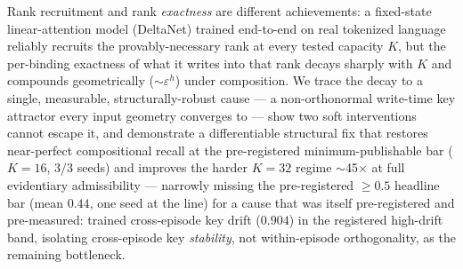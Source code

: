 Rank recruitment and rank \emph{exactness} are different achievements: a
fixed-state linear-attention model (DeltaNet) trained end-to-end on real
tokenized language reliably recruits the provably-necessary rank at every
tested capacity $K$, but the per-binding exactness of what it writes into
that rank decays sharply with $K$ and compounds geometrically ($\sim
\varepsilon^h$) under composition. We trace the decay to a single,
measurable, structurally-robust cause --- a non-orthonormal write-time key
attractor every input geometry converges to --- show two soft interventions
cannot escape it, and demonstrate a differentiable structural fix that
restores near-perfect compositional recall at the pre-registered
minimum-publishable bar ($K{=}16$, 3/3 seeds) and improves the harder
$K{=}32$ regime $\sim$45$\times$ at full evidentiary admissibility ---
narrowly missing the pre-registered $\geq 0.5$ headline bar (mean $0.44$,
one seed at the line) for a cause that was itself pre-registered and
pre-measured: trained cross-episode key drift ($0.904$) in the registered
high-drift band, isolating cross-episode key \emph{stability}, not
within-episode orthogonality, as the remaining bottleneck.
